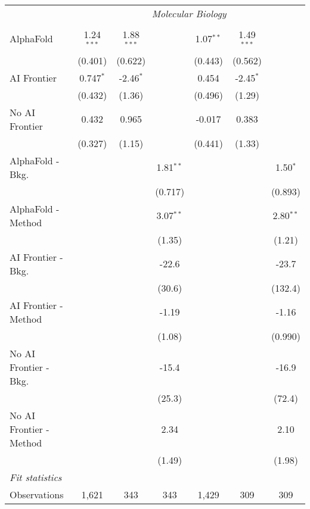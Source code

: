 \begin{tabular}{lcccccc}
 & \multicolumn{6}{c}{\textit{Molecular Biology}} \\ \\
   AlphaFold               & 1.24$^{***}$ & 1.88$^{***}$ &             & 1.07$^{**}$ & 1.49$^{***}$ &   \\   
                           & (0.401)      & (0.622)      &             & (0.443)     & (0.562)      &   \\   
   AI Frontier             & 0.747$^{*}$  & -2.46$^{*}$  &             & 0.454       & -2.45$^{*}$  &   \\   
                           & (0.432)      & (1.36)       &             & (0.496)     & (1.29)       &   \\   
   No AI Frontier          & 0.432        & 0.965        &             & -0.017      & 0.383        &   \\   
                           & (0.327)      & (1.15)       &             & (0.441)     & (1.33)       &   \\   
   AlphaFold - Bkg.        &              &              & 1.81$^{**}$ &             &              & 1.50$^{*}$\\   
                           &              &              & (0.717)     &             &              & (0.893)\\   
   AlphaFold - Method      &              &              & 3.07$^{**}$ &             &              & 2.80$^{**}$\\   
                           &              &              & (1.35)      &             &              & (1.21)\\   
   AI Frontier - Bkg.      &              &              & -22.6       &             &              & -23.7\\   
                           &              &              & (30.6)      &             &              & (132.4)\\   
   AI Frontier - Method    &              &              & -1.19       &             &              & -1.16\\   
                           &              &              & (1.08)      &             &              & (0.990)\\   
   No AI Frontier - Bkg.   &              &              & -15.4       &             &              & -16.9\\   
                           &              &              & (25.3)      &             &              & (72.4)\\   
   No AI Frontier - Method &              &              & 2.34        &             &              & 2.10\\   
                           &              &              & (1.49)      &             &              & (1.98)\\   
   \midrule
   \emph{Fit statistics}\\
   Observations            & 1,621        & 343          & 343         & 1,429       & 309          & 309\\  
   

\end{tabular}
